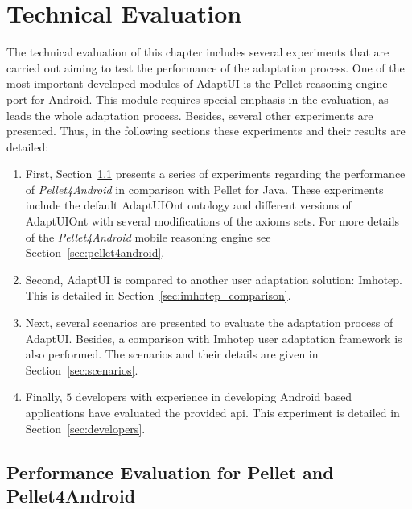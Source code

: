 \section{Technical Evaluation}
\label{sec:technical_evaluation}

The technical evaluation of this chapter includes several experiments that are 
carried out aiming to test the performance of the adaptation process. One of 
the most important developed modules of AdaptUI is the Pellet reasoning 
engine port for Android. This module requires special emphasis in the evaluation, 
as leads the whole adaptation process. Besides, several other experiments are 
presented. Thus, in the following sections these experiments and their results 
are detailed:


\begin{enumerate}[label=\alph*)]
  \item First, Section~\ref{sec:performance_evaluation} presents a series 
  of experiments regarding the performance of \textit{Pellet4Android} in 
  comparison with Pellet for Java. These experiments include the default
  AdaptUIOnt ontology and different versions of AdaptUIOnt with several modifications
  of the axioms sets. For more details of the \textit{Pellet4Android} mobile 
  reasoning engine see Section~\ref{sec:pellet4android}.
  
  \item Second, AdaptUI is compared to another user adaptation solution: 
  Imhotep. This is detailed in Section~\ref{sec:imhotep_comparison}.
  
  \item Next, several scenarios are presented to evaluate the adaptation 
  process of AdaptUI. Besides, a comparison with Imhotep user adaptation 
  framework is also performed. The scenarios and their details are given in 
  Section~\ref{sec:scenarios}.
  
  \item Finally, $5$ developers with experience in developing Android based 
  applications have evaluated the provided \acs{api}. This experiment is detailed
  in Section~\ref{sec:developers}.
\end{enumerate}


\subsection{Performance Evaluation for Pellet and Pellet4Android}
\label{sec:performance_evaluation}

